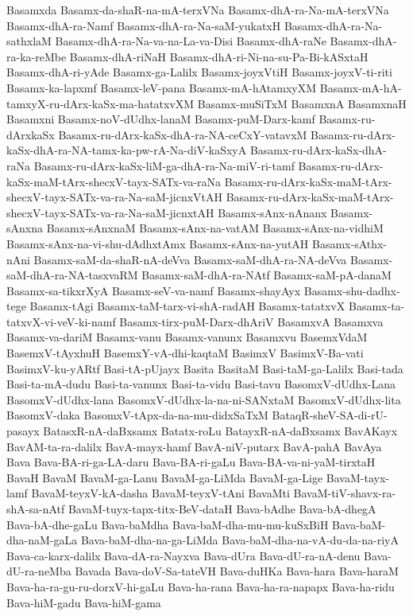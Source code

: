 {Basamxda
Basamx-da-shaR-na-mA-terxVNa
Basamx-dhA-ra-Na-mA-terxVNa
Basamx-dhA-ra-Namf
Basamx-dhA-ra-Na-saM-yukatxH
Basamx-dhA-ra-Na-sathxlaM
Basamx-dhA-ra-Na-va-na-La-va-Disi
Basamx-dhA-raNe
Basamx-dhA-ra-ka-reMbe
Basamx-dhA-riNaH
Basamx-dhA-ri-Ni-na-su-Pa-Bi-kASxtaH
Basamx-dhA-ri-yAde
Basamx-ga-Lalilx
Basamx-joyxVtiH
Basamx-joyxV-ti-riti
Basamx-ka-lapxmf
Basamx-leV-pana
Basamx-mA-hAtamxyXM
Basamx-mA-hA-tamxyX-ru-dArx-kaSx-ma-hatatxvXM
Basamx-muSiTxM
BasamxnA
BasamxnaH
Basamxni
Basamx-noV-dUdhx-lanaM
Basamx-puM-Darx-kamf
Basamx-ru-dArxkaSx
Basamx-ru-dArx-kaSx-dhA-ra-NA-ceCxY-vatavxM
Basamx-ru-dArx-kaSx-dhA-ra-NA-tamx-ka-pw-rA-Na-diV-kaSxyA
Basamx-ru-dArx-kaSx-dhA-raNa
Basamx-ru-dArx-kaSx-liM-ga-dhA-ra-Na-miV-ri-tamf
Basamx-ru-dArx-kaSx-maM-tArx-shecxV-tayx-SATx-va-raNa
Basamx-ru-dArx-kaSx-maM-tArx-shecxV-tayx-SATx-va-ra-Na-saM-jicnxVtAH
Basamx-ru-dArx-kaSx-maM-tArx-shecxV-tayx-SATx-va-ra-Na-saM-jicnxtAH
Basamx-sAnx-nAnanx
Basamx-sAnxna
Basamx-sAnxnaM
Basamx-sAnx-na-vatAM
Basamx-sAnx-na-vidhiM
Basamx-sAnx-na-vi-shu-dAdhxtAmx
Basamx-sAnx-na-yutAH
Basamx-sAthx-nAni
Basamx-saM-da-shaR-nA-deVva
Basamx-saM-dhA-ra-NA-deVva
Basamx-saM-dhA-ra-NA-tasxvaRM
Basamx-saM-dhA-ra-NAtf
Basamx-saM-pA-danaM
Basamx-sa-tikxrXyA
Basamx-seV-va-namf
Basamx-shayAyx
Basamx-shu-dadhx-tege
Basamx-tAgi
Basamx-taM-tarx-vi-shA-radAH
Basamx-tatatxvX
Basamx-ta-tatxvX-vi-veV-ki-namf
Basamx-tirx-puM-Darx-dhAriV
BasamxvA
Basamxva
Basamx-va-dariM
Basamx-vanu
Basamx-vanunx
Basamxvu
BasemxVdaM
BasemxV-tAyxhuH
BasemxY-vA-dhi-kaqtaM
BasimxV
BasimxV-Ba-vati
BasimxV-ku-yARtf
Basi-tA-pUjayx
Basita
BasitaM
Basi-taM-ga-Lalilx
Basi-tada
Basi-ta-mA-dudu
Basi-ta-vanunx
Basi-ta-vidu
Basi-tavu
BasomxV-dUdhx-Lana
BasomxV-dUdhx-lana
BasomxV-dUdhx-la-na-ni-SANxtaM
BasomxV-dUdhx-lita
BasomxV-daka
BasomxV-tApx-da-na-mu-didxSaTxM
BataqR-sheV-SA-di-rU-pasayx
BatasxR-nA-daBxsamx
Batatx-roLu
BatayxR-nA-daBxsamx
BavAKayx
BavAM-ta-ra-dalilx
BavA-mayx-hamf
BavA-niV-putarx
BavA-pahA
BavAya
Bava
Bava-BA-ri-ga-LA-daru
Bava-BA-ri-gaLu
Bava-BA-va-ni-yaM-tirxtaH
BavaH
BavaM
BavaM-ga-Lanu
BavaM-ga-LiMda
BavaM-ga-Lige
BavaM-tayx-lamf
BavaM-teyxV-kA-dasha
BavaM-teyxV-tAni
BavaMti
BavaM-tiV-shavx-ra-shA-sa-nAtf
BavaM-tuyx-tapx-titx-BeV-dataH
Bava-bAdhe
Bava-bA-dhegA
Bava-bA-dhe-gaLu
Bava-baMdha
Bava-baM-dha-mu-mu-kuSxBiH
Bava-baM-dha-naM-gaLa
Bava-baM-dha-na-ga-LiMda
Bava-baM-dha-na-vA-du-da-na-riyA
Bava-ca-karx-dalilx
Bava-dA-ra-Nayxva
Bava-dUra
Bava-dU-ra-nA-denu
Bava-dU-ra-neMba
Bavada
Bava-doV-Sa-tateVH
Bava-duHKa
Bava-hara
Bava-haraM
Bava-ha-ra-gu-ru-dorxV-hi-gaLu
Bava-ha-rana
Bava-ha-ra-napapx
Bava-ha-ridu
Bava-hiM-gadu
Bava-hiM-gama
}
